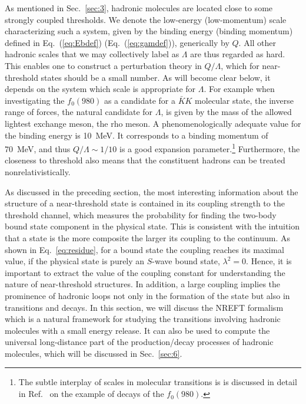 As mentioned in Sec.~\ref{sec:3}, hadronic molecules are located close to some
strongly coupled thresholds.
We denote the low-energy (low-momentum) scale characterizing such a system,
given by the binding energy (binding momentum) defined in Eq.~(\ref{eq:Ebdef})
(Eq.~(\ref{eq:gamdef})), generically by $Q$.
All other hadronic scales that we may collectively label as $\Lambda$ are thus
regarded as hard. This enables one to construct a perturbation theory in
$Q/\Lambda$, which for near-threshold states should be a small number.
As will become clear below, it depends on the system which scale is appropriate
for $\Lambda$. For example when investigating the $f_0(980)$ as a candidate for a
$\bar KK$ molecular state, the inverse range of forces, the natural candidate
for $\Lambda$, is given by the mass of the allowed lightest exchange meson, the
rho meson. A phenomenologically adequate value for the binding energy is 10~MeV.
It corresponds to a binding momentum of 70~MeV, and thus $Q/\Lambda \sim
1/10$ is a good expansion parameter.\footnote{The subtle interplay of scales in
molecular transitions is  is discussed in detail in Ref.~\cite{Hanhart:2007wa}
on the example of decays of the $f_0(980)$.} Furthermore, the closeness to
threshold also means that the constituent hadrons can be treated
nonrelativistically.

As discussed in the preceding section, the most interesting information about
the structure of a near-threshold state is contained in its coupling strength to
the threshold channel, which measures the probability for finding the two-body
bound state component in the physical state. This is consistent with the
intuition that a state is the more composite the larger its coupling to the
continuum. As shown in Eq.~\eqref{eq:residue}, for a bound state the coupling
reaches its maximal value, if the physical state is purely an $S$-wave bound
state, $\lambda^2=0$. Hence, it is important to extract the value of the
coupling constant for understanding the nature of near-threshold structures.
In addition, a large coupling implies the prominence of hadronic loops not only
in the formation of the state but also in transitions and decays.
In this section, we will discuss the NREFT formalism which is a natural
framework for studying the transitions involving hadronic molecules with a small
energy release. It can also be used to compute the universal long-distance part
of the production/decay processes of hadronic molecules, which will be discussed
in Sec.~\ref{sec:6}.

